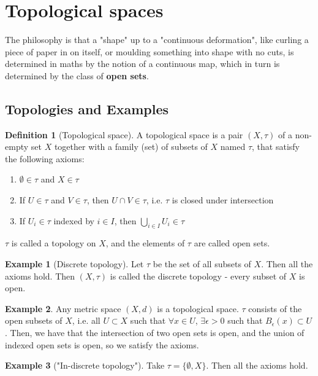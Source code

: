 \documentclass{article}
\theoremstyle{definition}
\newtheorem{defn}{Definition}[section]
\newtheorem{exmp}{Example}[section]
\theoremstyle{plain}%
\theoremstyle{remark}
\newcommand{\Union}{\bigcup}
\begin{document}
\section{Topological spaces}

The philosophy is that a "shape" up to a "continuous deformation", like curling a piece of paper in on itself, or moulding something into shape with no cuts, is determined in maths by the notion of a continuous map, which in turn is determined by the class of \textbf{open sets}.

\subsection{Topologies and Examples}

\begin{defn}[Topological space]
A topological space is a pair $(X, \tau)$ of a non-empty set $X$ together with a family (set) of subsets of $X$ named $\tau$, that satisfy the following axioms:
\begin{enumerate}
    \item $\emptyset \in \tau$ and $X \in \tau$
    \item If $U \in \tau$ and $V \in \tau$, then $U \cap V \in \tau$, i.e. $\tau$ is closed under intersection
    \item If $U_i \in \tau$ indexed by $i \in I$, then $\Union_{i \in I}U_i \in \tau$
\end{enumerate}

$\tau$ is called a topology on $X$, and the elements of $\tau$ are called open sets.
\end{defn}

\begin{exmp}[Discrete topology]
Let $\tau$ be the set of all subsets of $X$. Then all the axioms hold. Then $(X, \tau)$ is called the discrete topology - every subset of $X$ is open.
\end{exmp}

\begin{exmp}
Any metric space $(X,d)$ is a topological space. $\tau$ consists of the open subsets of $X$, i.e. all $U \subset X$ such that $\forall x \in U$, $\exists \epsilon > 0$ such that $B_{\epsilon}(x) \subset U$. Then, we have that the intersection of two open sets is open, and the union of indexed open sets is open, so we satisfy the axioms.
\end{exmp}

\begin{exmp}["In-discrete topology"]
Take $\tau = \{\emptyset, X\}$. Then all the axioms hold.
\end{exmp}
\end{document}
